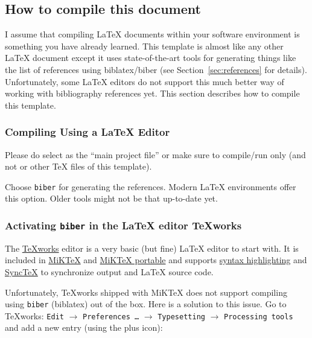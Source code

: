 \subsection{How to compile this document}\myimportant
\label{sec:howtocompile}

I assume that compiling \LaTeX{} documents within your software
environment is something you have already learned. This template is
almost like any other \LaTeX{} document except it uses
state-of-the-art tools for generating things like the list of
references using biblatex/biber (see
Section~\ref{sec:references} for details). Unfortunately, some \LaTeX{} editors
do not support this much better way of working with bibliography
references yet. This section describes how to compile this template.

\subsubsection{Compiling Using a \LaTeX{} Editor}

Please do select  as the \enquote{main project file} or make
sure to compile/run only  (and not 
or other \TeX{} files of this template).

Choose \texttt{biber} for generating the references. Modern LaTeX{}
environments offer this option. Older tools might not be that up-to-date
yet.


\subsubsection{Activating \texttt{biber} in the \LaTeX{} editor TeXworks}
\label{sec:biberTeXworks}

The \href{https://www.tug.org/texworks/}{TeXworks} editor is a very
basic (but fine) \LaTeX{} editor to start with. It is included in
\href{http://miktex.org/}{MiKTeX} and
\href{http://miktex.org/portable}{MiKTeX portable} and supports
\href{https://en.wikipedia.org/wiki/Syntax_highlighting}{syntax
  highlighting} and
\href{http://itexmac.sourceforge.net/SyncTeX.html}{SyncTeX} to
synchronize  output and \LaTeX{} source code.

Unfortunately, TeXworks shipped with MiKTeX does not support compiling
using \texttt{biber} (biblatex) out of the box. Here is a solution to
this issue. Go to TeXworks: \texttt{Edit} $\rightarrow$
\texttt{Preferences~\ldots} $\rightarrow$ \texttt{Typesetting} $\rightarrow$
\texttt{Processing tools} and add a new entry (using the plus icon):

